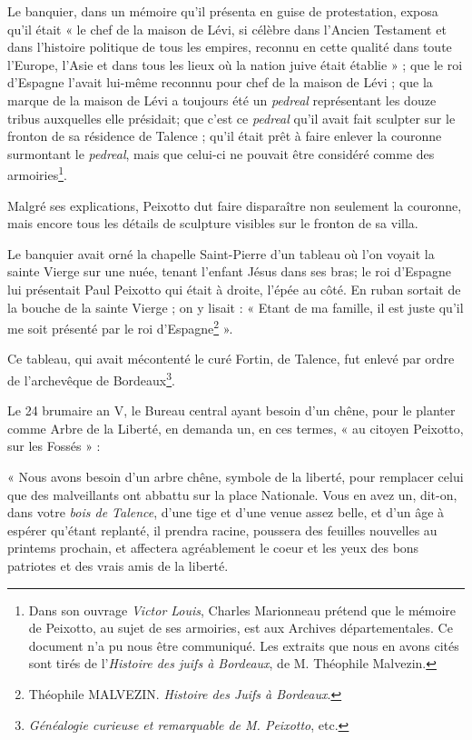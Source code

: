 Le banquier, dans un mémoire qu'il présenta en guise de protestation, exposa qu'il était « le chef de la maison de Lévi, si célèbre dans l'Ancien Testament et dans l'histoire politique de tous les empires, reconnu en cette qualité dans toute l'Europe, l'Asie et dans tous les lieux où la nation juive était établie » ; que le roi d'Espagne l'avait lui-même reconnnu pour chef de la maison de Lévi ; que la marque de la maison de Lévi a toujours été un \textit{pedreal} représentant les douze tribus auxquelles elle présidait; que c'est ce \textit{pedreal} qu'il avait fait sculpter sur le fronton de sa résidence de Talence ; qu'il était prêt à faire enlever la couronne surmontant le \textit{pedreal}, mais que celui-ci ne pouvait être considéré comme des armoiries\footnote{Dans son ouvrage \textit{Victor Louis}, Charles Marionneau prétend que le mémoire de Peixotto, au sujet de ses armoiries, est aux Archives départementales. Ce document n'a pu nous être communiqué. Les extraits que nous en avons cités sont tirés de l'\textit{Histoire des juifs à Bordeaux}, de M. Théophile Malvezin.}.

Malgré ses explications, Peixotto dut faire disparaître non seulement la couronne, mais encore tous les détails de sculpture visibles sur le fronton de sa villa.

Le banquier avait orné la chapelle Saint-Pierre d'un tableau où l'on voyait la sainte Vierge sur une nuée, tenant l'enfant Jésus dans ses bras; le roi d'Espagne lui présentait Paul Peixotto qui était à droite, l'épée au côté. En ruban sortait de la bouche de la sainte Vierge ; on y lisait : « Etant de ma famille, il est juste qu'il me soit présenté par le roi d'Espagne\footnote{Théophile MALVEZIN. \textit{Histoire des Juifs à Bordeaux}.} ».

Ce tableau, qui avait mécontenté le curé Fortin, de Talence, fut enlevé par ordre de l'archevêque de Bordeaux\footnote{\textit{Généalogie curieuse et remarquable de M. Peixotto}, etc.}. 

Le 24 brumaire an V, le Bureau central ayant besoin d'un chêne, pour le planter comme Arbre de la Liberté, en demanda un, en ces termes, « au citoyen Peixotto, sur les Fossés » : 

« Nous avons besoin d'un arbre chêne, symbole de la liberté, pour remplacer celui que des malveillants ont abbattu sur la place Nationale. Vous en avez un, dit-on, dans votre \textit{bois de Talence}, d'une tige et d'une venue assez belle, et d'un âge à espérer qu'étant replanté, il prendra racine, poussera des feuilles nouvelles au printems prochain, et affectera agréablement le coeur et les yeux des bons patriotes et des vrais amis de la liberté.

